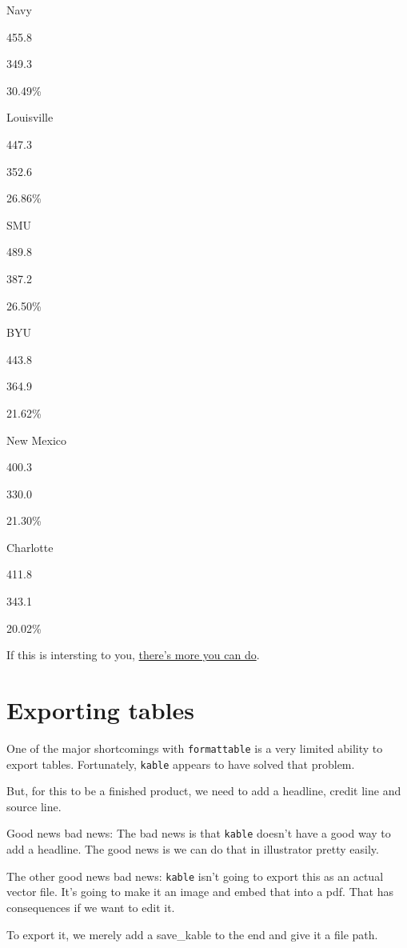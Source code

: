 \documentclass[]{book}
\begin{document}
Navy

455.8

349.3

{30.49\%}

Louisville

447.3

352.6

{26.86\%}

SMU

489.8

387.2

{26.50\%}

BYU

443.8

364.9

{21.62\%}

New Mexico

400.3

330.0

{21.30\%}

Charlotte

411.8

343.1

{20.02\%}

If this is intersting to you, \href{https://cran.r-project.org/web/packages/kableExtra/vignettes/awesome_table_in_html.html\#overview}{there's more you can do}.

\hypertarget{exporting-tables}{%
\section{Exporting tables}\label{exporting-tables}}

One of the major shortcomings with \texttt{formattable} is a very limited ability to export tables. Fortunately, \texttt{kable} appears to have solved that problem.

But, for this to be a finished product, we need to add a headline, credit line and source line.

Good news bad news: The bad news is that \texttt{kable} doesn't have a good way to add a headline. The good news is we can do that in illustrator pretty easily.

The other good news bad news: \texttt{kable} isn't going to export this as an actual vector file. It's going to make it an image and embed that into a pdf. That has consequences if we want to edit it.

To export it, we merely add a save\_kable to the end and give it a file path.
\end{document}
